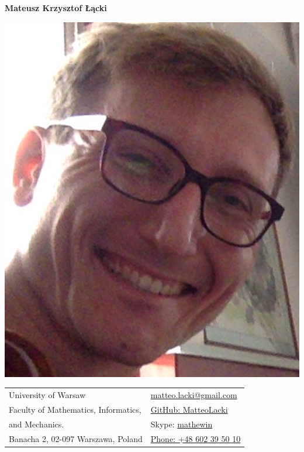 \documentclass[letterpaper,11pt,oneside]{article}
\newcommand*{\Skype}{\href{skype name:mathewin?add}{mathewin}}
\newcommand{\Absender}[1][\normalsize]{\Skype}
\begin{document}

\noindent  \LARGE{\textbf{Mateusz Krzysztof Łącki}}  \\
\normalsize


\begin{minipage}{.1\textwidth}
\includegraphics[width=\linewidth]{photo.png}
\end{minipage}
\begin{minipage}{.9\textwidth}
\begin{center}
\begin{tabular}{l l}
 University of Warsaw& \hspace{1in}\href{mailto:matteo.lacki@gmail.com}{matteo.lacki@gmail.com}\\
 Faculty of Mathematics, Informatics,     & \hspace{1in}\href{https://github.com/MatteoLacki}{GitHub: MatteoLacki}   \\
 and Mechanics. & \hspace{1in}Skype: \Absender  \\
 Banacha 2, 02-097 Warszawa, Poland & \hspace{1in}\href{callto:+48 602 39 50 10}{Phone: +48 602 39 50 10}\\
\end{tabular}
\end{center}
\end{minipage}
\end{document}
